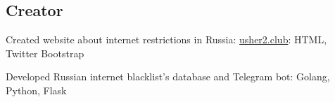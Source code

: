 \documentclass[letter,10pt]{article}
\begin{document}
\subsection{{Creator}}
\begin{zitemize}
        \item Created website about internet restrictions in Russia: \href{https://usher2.club}{usher2.club}: HTML, Twitter Bootstrap
        \item Developed Russian internet blacklist's database and Telegram bot: Golang, Python, Flask
\end{zitemize}
\end{document}
